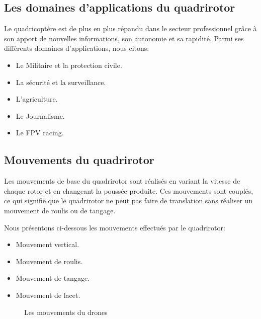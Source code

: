 	\subsection{Les domaines d'applications du quadrirotor}
	
	Le quadricoptère est de plus en plus répandu dans le secteur professionnel grâce à son apport de nouvelles informations, son autonomie et sa rapidité. Parmi ses différents domaines d'applications, nous citons: 
	
	\begin{itemize}
		
		\item Le Militaire et la protection civile.
		\item La sécurité et la surveillance.
		\item L'agriculture.
		\item Le Journalisme.
		\item Le FPV racing.
		
	\end{itemize}
	\newpage
	\subsection{Mouvements du quadrirotor}
	Les mouvements de base du quadrirotor sont réalisés en variant la vitesse de chaque rotor et en changeant la poussée produite. Ces mouvements sont couplés, ce qui signifie que le quadrirotor ne peut pas faire de translation sans réaliser un mouvement de roulis ou de tangage\cite{WikiMemoires}.
	
	Nous présentons ci-dessous les mouvements effectués par le quadrirotor:		
	\begin{itemize}
		\item Mouvement vertical.
		\item Mouvement de roulis.
		\item Mouvement de tangage.
		\item Mouvement de lacet.
	\end{itemize}
	\begin{figure} [H]
	\begin{center}
		\centering
	\end{center}
	\caption{Les mouvements du drones }
	\end{figure}


